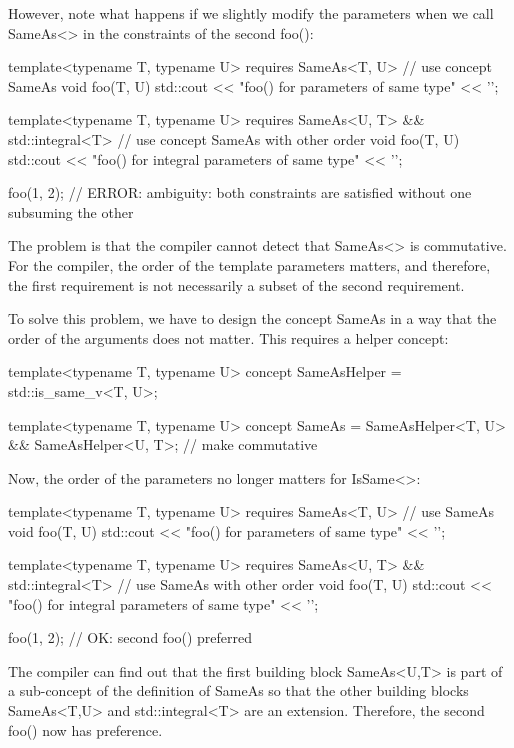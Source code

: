 However, note what happens if we slightly modify the parameters when we call SameAs<> in the constraints of the second foo():

\begin{cpp}
template<typename T, typename U>
requires SameAs<T, U> // use concept SameAs
void foo(T, U)
{
	std::cout << "foo() for parameters of same type" << '\n';
}

template<typename T, typename U>
requires SameAs<U, T> && std::integral<T> // use concept SameAs with other order
void foo(T, U)
{
	std::cout << "foo() for integral parameters of same type" << '\n';
}

foo(1, 2); // ERROR: ambiguity: both constraints are satisfied without one subsuming the other
\end{cpp}

The problem is that the compiler cannot detect that SameAs<> is commutative. For the compiler, the order of the template parameters matters, and therefore, the first requirement is not necessarily a subset of the second requirement.

To solve this problem, we have to design the concept SameAs in a way that the order of the arguments does not matter. This requires a helper concept:

\begin{cpp}
template<typename T, typename U>
concept SameAsHelper = std::is_same_v<T, U>;

template<typename T, typename U>
concept SameAs = SameAsHelper<T, U> && SameAsHelper<U, T>; // make commutative
\end{cpp}

Now, the order of the parameters no longer matters for IsSame<>:


\begin{cpp}
template<typename T, typename U>
requires SameAs<T, U> // use SameAs
void foo(T, U)
{
	std::cout << "foo() for parameters of same type" << '\n';
}

template<typename T, typename U>
requires SameAs<U, T> && std::integral<T> // use SameAs with other order
void foo(T, U)
{
	std::cout << "foo() for integral parameters of same type" << '\n';
}

foo(1, 2); // OK: second foo() preferred
\end{cpp}

The compiler can find out that the first building block SameAs<U,T> is part of a sub-concept of the definition of SameAs so that the other building blocks SameAs<T,U> and std::integral<T> are an extension. Therefore, the second foo() now has preference.

